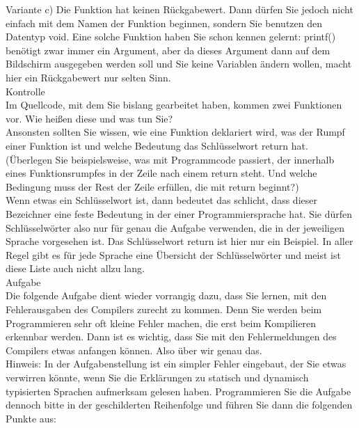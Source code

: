 Variante c) Die Funktion hat keinen Rückgabewert. Dann dürfen Sie jedoch nicht einfach mit dem Namen der Funktion beginnen, sondern Sie benutzen den \glqq{}Datentyp\grqq{} void. Eine solche Funktion haben Sie schon kennen gelernt: printf() benötigt zwar immer ein Argument, aber da dieses Argument dann auf dem Bildschirm ausgegeben werden soll und Sie keine Variablen ändern wollen, macht hier ein Rückgabewert nur selten Sinn.\\

Kontrolle\\

Im Quellcode, mit dem Sie bislang gearbeitet haben, kommen zwei Funktionen vor. Wie heißen diese und was tun Sie?\\

Ansonsten sollten Sie wissen, wie eine Funktion deklariert wird, was der Rumpf einer Funktion ist und welche Bedeutung das Schlüsselwort return hat. (Überlegen Sie beispielsweise, was mit Programmcode passiert, der innerhalb eines Funktionsrumpfes in der Zeile nach einem return steht. Und welche Bedingung muss der Rest der Zeile erfüllen, die mit return beginnt?)\\

Wenn etwas ein Schlüsselwort ist, dann bedeutet das schlicht, dass dieser Bezeichner eine feste Bedeutung in der einer Programmiersprache hat. Sie dürfen Schlüsselwörter also nur für genau die Aufgabe verwenden, die in der jeweiligen Sprache vorgesehen ist. Das Schlüsselwort return ist hier nur ein Beispiel. In aller Regel gibt es für jede Sprache eine Übersicht der Schlüsselwörter und meist ist diese Liste auch nicht allzu lang.\\

Aufgabe\\

Die folgende Aufgabe dient wieder vorrangig dazu, dass Sie lernen, mit den Fehlerausgaben des Compilers zurecht zu kommen. Denn Sie werden beim Programmieren sehr oft kleine Fehler machen, die erst beim Kompilieren erkennbar werden. Dann ist es wichtig, dass Sie mit den Fehlermeldungen des Compilers etwas anfangen können. Also über wir genau das. \\

Hinweis: In der Aufgabenstellung ist ein simpler Fehler eingebaut, der Sie etwas verwirren könnte, wenn Sie die Erklärungen zu statisch und dynamisch typisierten Sprachen aufmerksam gelesen haben. Programmieren Sie die Aufgabe dennoch bitte in der geschilderten Reihenfolge und führen Sie dann die folgenden Punkte aus:\\

